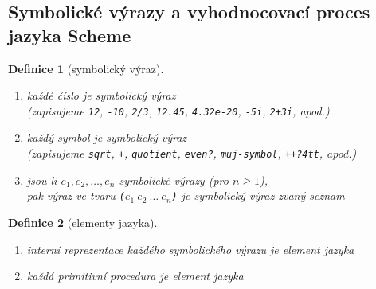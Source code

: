 \documentclass[10pt,a4paper]{article}
\newtheorem{definition}{Definice}
\begin{document}
  \subsection{Symbolické výrazy a vyhodnocovací proces jazyka Scheme}
    \begin{definition}[symbolický výraz]\label{def-symbolicky-vyraz}\
      \begin{enumerate}
        \item každé \textit{číslo} je symbolický výraz\\ (zapisujeme \texttt{12}, \texttt{-10}, \texttt{2/3}, \texttt{12.45}, \texttt{4.32e-20}, \texttt{-5i}, \texttt{2+3i}, apod.)
        \item každý \textit{symbol} je symbolický výraz\\ (zapisujeme \texttt{sqrt}, \texttt{+}, \texttt{quotient}, \texttt{even?}, \texttt{muj-symbol}, \texttt{++?4tt}, apod.)
        \item jsou-li $e_{1}, e_{2}, \ldots, e_{n}$ symbolické výrazy (pro $n \geq 1$),\\ pak výraz ve tvaru \texttt{($e_1\ e_2\ \ldots\ e_n$)} je symbolický výraz zvaný \textit{seznam}
      \end{enumerate}
    \end{definition}
    \begin{definition}[elementy jazyka]\label{def-elementy-jazyka}\
      \begin{enumerate}
        \item interní reprezentace každého symbolického výrazu je element jazyka
        \item každá primitivní procedura je element jazyka
      \end{enumerate}
    \end{definition}
\end{document}

